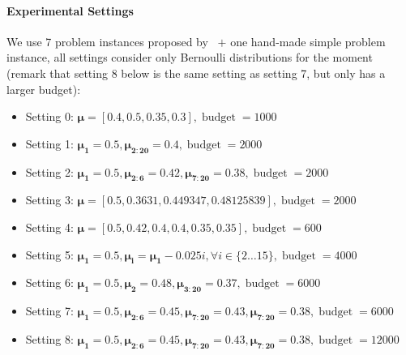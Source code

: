 \documentclass[runningheads,a4paper]{llncs}
\begin{document}
\paragraph{\bfseries{Experimental Settings}}
We use 7 problem instances proposed by~\cite{audibert2010} $+$ one hand-made simple problem instance, all settings consider only Bernoulli distributions for the moment (remark that setting 8 below is the same setting as setting 7, but only has a larger budget):
\begin{itemize}
	\item Setting 0: $\mathbf{\mu}=[0.4, 0.5, 0.35, 0.3], \operatorname{budget}=1000$
	\item Setting 1: $\mathbf{\mu_1}=0.5, \mathbf{\mu_{2:20}}=0.4, \operatorname{budget}=2000$
	\item Setting 2: $\mathbf{\mu_1}=0.5, \mathbf{\mu_{2:6}}=0.42, \mathbf{\mu_{7:20}}=0.38, \operatorname{budget}=2000$
	\item Setting 3: $\mathbf{\mu}=[0.5, 0.3631, 0.449347, 0.48125839], \operatorname{budget}=2000$
	\item Setting 4: $\mathbf{\mu}=[0.5, 0.42, 0.4, 0.4, 0.35, 0.35], \operatorname{budget}=600$
	\item Setting 5: $\mathbf{\mu_1}=0.5, \mathbf{\mu_i}=\mathbf{\mu_1}-0.025i, \forall i\in\{2\ldots15\}, \operatorname{budget}=4000$
	\item Setting 6: $\mathbf{\mu_1}=0.5, \mathbf{\mu_2}=0.48, \mathbf{\mu_{3:20}}=0.37, \operatorname{budget}=6000$
	\item Setting 7: $\mathbf{\mu_1}=0.5, \mathbf{\mu_{2:6}}=0.45, \mathbf{\mu_{7:20}}=0.43, \mathbf{\mu_{7:20}}=0.38, \operatorname{budget}=6000$
	\item Setting 8: $\mathbf{\mu_1}=0.5, \mathbf{\mu_{2:6}}=0.45, \mathbf{\mu_{7:20}}=0.43, \mathbf{\mu_{7:20}}=0.38, \operatorname{budget}=12000$
\end{itemize}
\end{document}
